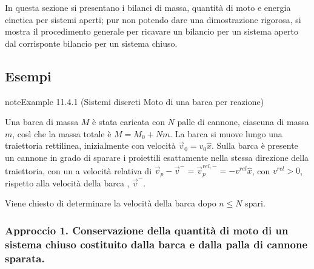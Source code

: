 \documentclass[letterpaper,10pt,italian]{jupyterBook}
\begin{document}
\sphinxAtStartPar
In questa sezione si presentano i bilanci di massa, quantità di moto e energia cinetica per sistemi aperti; pur non potendo dare una dimostrazione rigorosa, si mostra il procedimento generale per ricavare un bilancio per un sistema aperto dal corrisponte bilancio per un sistema chiuso.


\subsection{Esempi}
\label{\detokenize{ch/mechanics/dynamics-eom-open:esempi}}\label{ch/mechanics/dynamics-eom-open:mechanics:dynamics:open:ex:boat}
\begin{sphinxadmonition}{note}{Example 11.4.1 (Sistemi discreti \sphinxhyphen{} Moto di una barca per reazione)}



\sphinxAtStartPar
Una barca di massa \(M\) è stata caricata con \(N\) palle di cannone, ciascuna di massa \(m\), così che la massa totale è \(M = M_0 + N m\). La barca si muove lungo una traiettoria rettilinea, inizialmente con velocità \(\vec{v}_0 = v_0 \hat{x}\). Sulla barca è presente un cannone in grado di sparare i proiettili esattamente nella stessa direzione della traiettoria, con un a velocità relativa di \(\vec{v}_p - \vec{v}^- = \vec{v}_p^{rel,-} = - v^{rel} \hat{x}\), con \(v^{rel} > 0\), rispetto alla velocità della barca , \(\vec{v}^-\).

\sphinxAtStartPar
Viene chiesto di determinare la velocità della barca dopo \(n \le N\) spari.  

\sphinxAtStartPar
{}
\subsubsection*{Approccio 1. Conservazione della quantità di moto di un sistema chiuso costituito dalla barca e dalla palla di cannone sparata.}




\end{sphinxadmonition}
\end{document}
